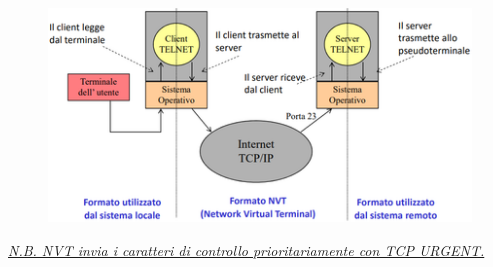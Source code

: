 \documentclass[11pt,a4paper,oneside]{book}
\theoremstyle{definition}
\begin{document}
\begin{figure}[!h]
	\includegraphics[scale=0.5]{Immagini/NVT2.png}
	\centering
\end{figure}
\underline{\textit{N.B. NVT invia i caratteri di controllo prioritariamente con TCP URGENT.}}

\pagebreak
\end{document}
